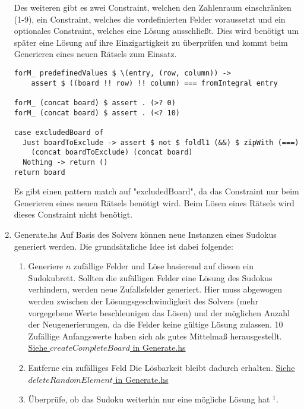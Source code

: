 \begin{enumerate}[(1)]
    Des weiteren gibt es zwei Constraint, welchen den Zahlenraum einschränken (1-9), ein Constraint, welches die vordefinierten Felder voraussetzt und ein optionales Constraint, welches eine Lösung ausschließt. Dies wird benötigt um später eine Lösung auf ihre Einzigartigkeit zu überprüfen und kommt beim Generieren eines neuen Rätsels zum Einsatz.
    \begin{lstlisting}
forM_ predefinedValues $ \(entry, (row, column)) ->
    assert $ ((board !! row) !! column) === fromIntegral entry

forM_ (concat board) $ assert . (>? 0)
forM_ (concat board) $ assert . (<? 10)

case excludedBoard of
  Just boardToExclude -> assert $ not $ foldl1 (&&) $ zipWith (===)
    (concat boardToExclude) (concat board)
  Nothing -> return ()
return board
    \end{lstlisting}
    Es gibt einen pattern match auf "excludedBoard", da das Constraint nur beim Generieren eines neuen Rätsels benötigt wird. Beim Lösen eines Rätsels wird dieses Constraint nicht benötigt.
    \item Generate.hs \newline
    Auf Basis des Solvers können neue Instanzen eines Sudokus generiert werden. Die grundsätzliche Idee ist dabei folgende:
        \begin{enumerate}[(1)]
            \item Generiere \(n\) zufällige Felder und Löse basierend auf diesen ein Sudokubrett. \newline
            Sollten die zufälligen Felder eine Lösung des Sudokus verhindern, werden neue Zufallsfelder generiert. Hier muss abgewogen werden zwischen der Lösungsgeschwindigkeit des Solvers (mehr vorgegebene Werte beschleunigen das Lösen) und der möglichen Anzahl der Neugenerierungen, da die Felder keine gültige Lösung zulassen. 10 Zufällige Anfangswerte haben sich als gutes Mittelmaß herausgestellt. \newline
            \underline{Siehe \(createCompleteBoard\) in Generate.hs}
            \item Entferne ein zufälliges Feld \newline
            Die Lösbarkeit bleibt dadurch erhalten. \newline
            \underline{Siehe \(deleteRandomElement\) in Generate.hs}
            \item Überprüfe, ob das Sudoku weiterhin nur eine mögliche Lösung hat $^1$.
            \begin{enumerate}

\end{enumerate}
\end{enumerate}
\end{enumerate}
